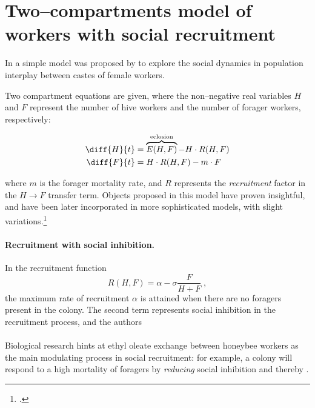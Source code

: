 \section[Two--compartments model with social recruitment]{Two--compartments model of workers with social recruitment}

In \citeyear{khoury2011} a simple model was proposed by \citeauthor{khoury2011} to explore the social dynamics in
population interplay between castes of female workers.

Two compartment equations are given, where the non--negative real variables $H$ and $F$ represent the number of hive workers and the number of forager workers, respectively:

\begin{align}
    \diff{H}{t} &= \overbrace{E(H,F)}^{\text{eclosion}}- H \cdot R(H,F) \label{eq:kh11h} \\
    \diff{F}{t} &= H \cdot R(H,F)  - m \cdot F \label{eq:kh11f}
\end{align}

where $m$ is the forager mortality rate, and $R$ represents the \emph{recruitment} factor in the $H \to F$ transfer term.
Objects proposed in this model have proven insightful, and have been later incorporated in more sophisticated models, with slight variations.\footcite{ratti2017}


\paragraph{Recruitment with social inhibition.}
In the recruitment function
\begin{equation}
    \label{eq:Recr}
    R(H,F) = \alpha - \sigma \frac{F}{H+F} \; ,
\end{equation}
the maximum rate of recruitment $\alpha$ is attained when there are no foragers present in the colony.
The second term represents social inhibition in the recruitment process, and the authors

\paragraph{}
Biological research hints at ethyl oleate exchange between honeybee workers as the main modulating process in social recruitment: for example, a colony will respond to a high mortality of foragers by \emph{reducing} social inhibition and thereby .

